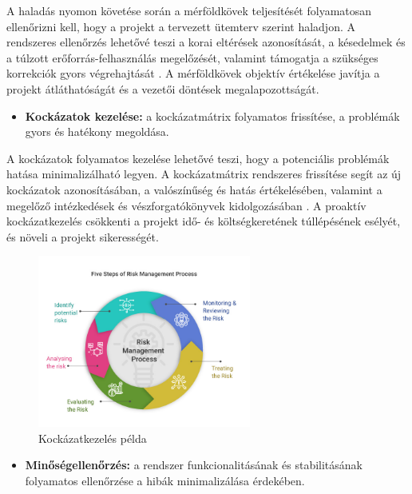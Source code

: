 A haladás nyomon követése során a mérföldkövek teljesítését folyamatosan ellenőrizni kell, hogy a projekt 
a tervezett ütemterv szerint haladjon. A rendszeres ellenőrzés lehetővé teszi 
a korai eltérések azonosítását, a késedelmek és a túlzott erőforrás-felhasználás megelőzését, valamint 
támogatja a szükséges korrekciók gyors végrehajtását \cite{Kovacs2016,Kaposi2019}. 
A mérföldkövek objektív értékelése javítja a projekt átláthatóságát és a vezetői döntések megalapozottságát.

\begin{itemize}
    \item \textbf{Kockázatok kezelése:} a kockázatmátrix folyamatos frissítése, a problémák gyors és hatékony megoldása.
\end{itemize}

A kockázatok folyamatos kezelése lehetővé teszi, hogy a potenciális problémák hatása minimalizálható legyen. 
A kockázatmátrix rendszeres frissítése segít az új kockázatok azonosításában, 
a valószínűség és hatás értékelésében, valamint a megelőző intézkedések és vészforgatókönyvek kidolgozásában \cite{Hajdu2014,Szalay2018}. 
A proaktív kockázatkezelés csökkenti a projekt idő- és költségkeretének túllépésének esélyét, és növeli a projekt sikerességét.

\begin{figure}[H]
    \centering
    \includegraphics[width=70mm, keepaspectratio]{figures/risk.jpg}
    \caption{Kockázatkezelés példa}
    \label{fig:risk}
\end{figure}

\begin{itemize}
    \item \textbf{Minőségellenőrzés:} a rendszer funkcionalitásának és stabilitásának folyamatos ellenőrzése a hibák minimalizálása érdekében.
\end{itemize}

